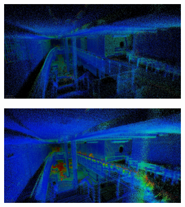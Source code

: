 \documentclass[english, bachelor, utf8]{base/thesis_telematics}
\begin{document}
\begin{figure}
\centering
\begin{subfigure}{0.45\textwidth}
    \centering
    \includegraphics[width=\textwidth]{pics/results_images/non_lio.jpg}
    \label{fig:results_non_lio}
\end{subfigure}
\begin{subfigure}{0.45\textwidth}
    \centering
    \includegraphics[width=\textwidth]{pics/results_images/non_livo.jpg}
    \label{fig:results_non_livo}
\end{subfigure}


\end{figure}
\end{document}
